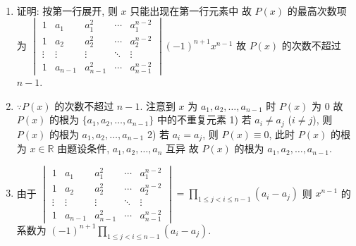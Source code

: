 	\paragraph{} %
		\begin{enumerate}
			\item %
			      证明: 按第一行展开, 则 $x$ 只能出现在第一行元素中
			      故 $P(x)$ 的最高次数项为 $\begin{vmatrix}
					      1      & a_1     & a_1^2     & \cdots & a_1^{n-2}     \\
					      1      & a_2     & a_2^2     & \cdots & a_2^{n-2}     \\
					      \vdots & \vdots  & \vdots    & \ddots & \vdots        \\
					      1      & a_{n-1} & a_{n-1}^2 & \cdots & a_{n-1}^{n-2}
				      \end{vmatrix} (-1)^{n+1} x^{n-1}$
			      故 $P(x)$ 的次数不超过 $n-1$.

			\item %
			      $\because P(x)$ 的次数不超过 $n-1$.
			      注意到 $x$ 为 $a_1, a_2, \dots, a_{n-1}$ 时 $P(x)$ 为 0
			      故 $P(x)$ 的根为 $\{a_1, a_2, \dots, a_{n-1}\}$ 中的不重复元素
			      1) 若 $a_i \neq a_j$ ($i \neq j$), 则 $P(x)$ 的根为 $a_1, a_2, \dots, a_{n-1}$
			      2) 若 $a_i = a_j$, 则 $P(x) \equiv 0$, 此时 $P(x)$ 的根为 $x \in \mathbb{R}$
			      由题设条件, $a_1, a_2, \dots, a_n$ 互异
			      故 $P(x)$ 的根为 $a_1, a_2, \dots, a_{n-1}$.

			\item %
			      由于 $\begin{vmatrix}
					      1      & a_1     & a_1^2     & \cdots & a_1^{n-2}     \\
					      1      & a_2     & a_2^2     & \cdots & a_2^{n-2}     \\
					      \vdots & \vdots  & \vdots    & \ddots & \vdots        \\
					      1      & a_{n-1} & a_{n-1}^2 & \cdots & a_{n-1}^{n-2}
				      \end{vmatrix} = \prod_{1 \leq j < i \leq n-1} (a_i - a_j)$
			      则 $x^{n-1}$ 的系数为 $(-1)^{n+1} \prod_{1 \leq j < i \leq n-1} (a_i - a_j)$.
		\end{enumerate}


\subsection{} %


